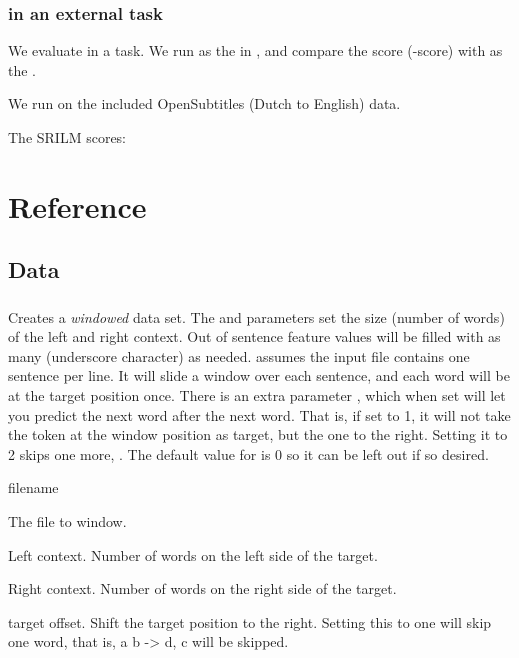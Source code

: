 \documentclass[a4paper,10pt,twoside]{report}
\begin{document}
\subsection{\wopr{} in an external task}

We evaluate \wopr{} in a \mt{} task.  We run \wopr{} as the \lm{} in
\pbmbmt{}, and compare the score (\bleu{}-score) with \srilm{} as the
\lm{}.

We run \pbmbmt{} on the included OpenSubtitles (Dutch to English)
data. 

The SRILM scores: 


\chapter{Reference}

\section{Data}

\subsection{}

Creates a \emph{windowed} data set. The  and 
parameters set the size (number of words) of the left and right
context. Out of sentence feature values will be filled with as many
\cmp{\_} (underscore character) as needed. \Wopr{} assumes the input
file contains one sentence per line. It will slide a window over each
sentence, and each word will be at the target position once. There is
an extra parameter , which when set will let you predict the
next word after the next word. That is, if set to \num{1}, it will not
take the token at the window position as target, but the one to the
right. Setting it to \num{2} skips one more, \etc{}. The default value
for  is 0 so it can be left out if so desired.

\begin{varlist}{filename}
\item[filename] The file to window.
\item[lc] Left context. Number of words on the left side of the target.
\item[rc] Right context. Number of words on the right side of the target.
\item[to] target offset. Shift the target position to the right. Setting this to
  one will skip one word, that is, a b -> d, c will be skipped.
\end{varlist}
\end{document}
